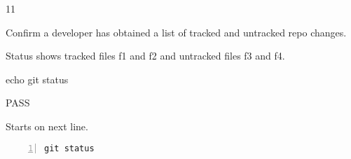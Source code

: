 \begin{description}[align=right,leftmargin=3.2cm,labelindent=3.0cm]
\item[Step:] 11
\item[Confirm:] Confirm a developer has obtained a list of tracked and untracked repo changes.
\item[Expectation:] Status shows tracked files f1 and f2 and untracked files f3 and f4.
\item[Command:] echo git  status
\item[Test Result:] PASS
\item[Evidence:] Starts on next line.
\end{description}
\begin{lstlisting}[numbers=left]
git status

\end{lstlisting}
